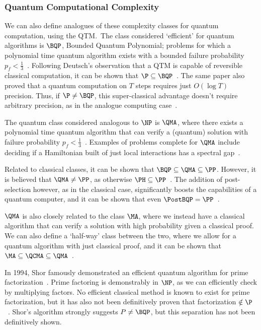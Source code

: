 \subsubsection*{Quantum Computational Complexity}
We can also define analogues of these complexity classes for quantum computation, using the QTM.\ The class considered `efficient' for quantum algorithms is $\BQP$, Bounded Quantum Polynomial; problems for which a polynomial time quantum algorithm exists with a bounded failure probability $p_{f}<\frac{1}{3}$~\cite{Nielsen2000}. Following Deutsch's observation that a QTM is capable of reversible classical computation, it can be shown that $\P\subseteq \BQP$~\cite{Bernstein1997}. The same paper also proved that a quantum computation on $T$ steps requires just $O\left(\log{T}\right)$ precision. Thus, if $\P\neq \BQP$, this super-classical advantage doesn't require arbitrary precision, as in the analogue computing case~\cite{Bernstein1997}.\par
The quantum class considered analogous to $\NP$ is $\QMA$, where there exists a polynomial time quantum algorithm that can verify a (quantum) solution with failure probability $p_{f}<\frac{1}{3}$~\cite{Watrous2008}. Examples of problems complete for $\QMA$ include deciding if a Hamiltonian built of just local interactions has a spectral gap~\cite{Kempe2004}.\par
Related to classical classes, it can be shown that $\BQP\subseteq \QMA\subseteq \PP$. However, it is believed that $\QMA\neq \PP$, as otherwise $\PH\subseteq \PP$~\cite{Vyalyi03}. The addition of post-selection however, as in the classical case, significantly boosts the capabilities of a quantum computer, and it can be shown that even $\PostBQP=\PP$~\cite{Aaronson2004c}.\par
$\QMA$ is also closely related to the class $\MA$, where we instead have a classical algorithm that can verify a solution with high probability given a classical proof. We can also define a `half-way' class between the two, where we allow for a quantum algorithm with just classical proof, and it can be shown that $\MA\subseteq \QCMA\subseteq \QMA$~\cite{Aharonov2002}.\par
In 1994, Shor famously demonstrated an efficient quantum algorithm for prime factorization~\cite{Shor1994}. Prime factoring is demonstrably in $\NP$, as we can efficiently check by multiplying factors. No efficient classical method is known to exist for prime factorization, but it has also not been definitively proven that factorization $\notin \P$~\cite{Nielsen2000}. Shor's algorithm strongly suggests $P\neq \BQP$, but this separation has not been definitively shown.\par
